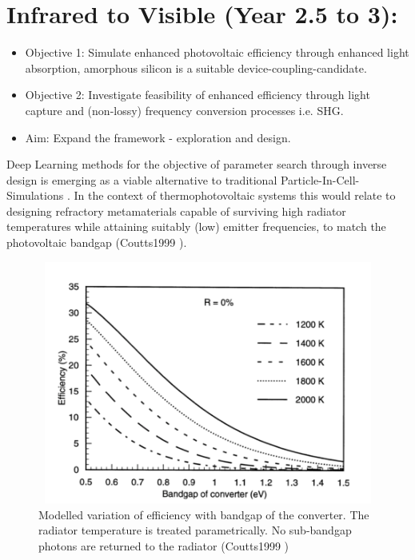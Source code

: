 \section*{Infrared to Visible (Year 2.5 to 3):}
\begin{itemize}
    \item Objective 1: Simulate enhanced photovoltaic efficiency through enhanced light absorption, amorphous silicon is a suitable device-coupling-candidate.
    \item Objective 2: Investigate feasibility of enhanced efficiency through light capture and (non-lossy) frequency conversion processes i.e. SHG.
    \item Aim: Expand the framework - exploration and design.
\end{itemize}
\vspace{5mm}
Deep Learning methods for the objective of parameter search through inverse design is emerging as a viable alternative to traditional Particle-In-Cell-Simulations \cite{Nadell2019}. In the context of thermophotovoltaic systems this would relate to designing refractory metamaterials capable of surviving high radiator temperatures while attaining suitably (low) emitter frequencies, to match the photovoltaic bandgap (Coutts1999 \cite{coutts1999}).
\begin{figure} [!h]
	\centering
	\includegraphics[width=14cm,height=8cm,keepaspectratio]{figures/introduction/tpv1.png}
	\setlength\belowcaptionskip{3pt}
	\caption{Modelled variation of efficiency with bandgap of the converter. The radiator temperature is treated parametrically. No sub-bandgap photons are returned to the radiator (Coutts1999 \cite{coutts1999})}
	\label{some-figure}
\end{figure}

